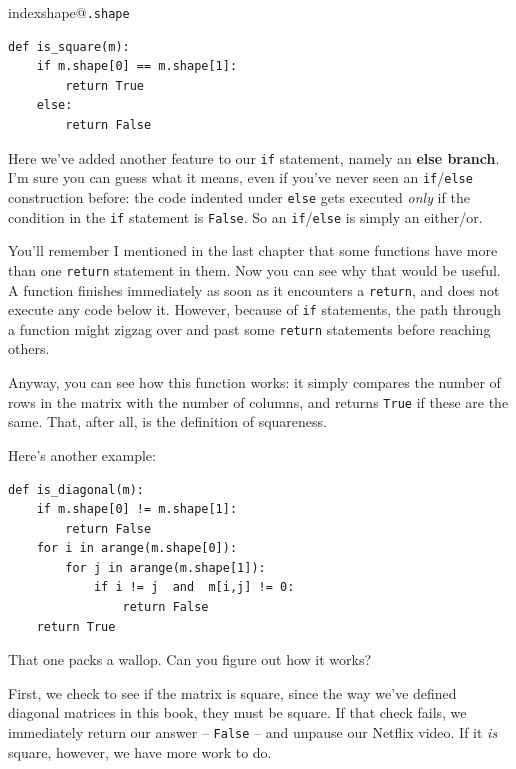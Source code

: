 index{shape@\texttt{.shape}}

\label{multipleReturns}

\begin{Verbatim}[fontsize=\small,samepage=true,frame=single,framesep=3mm]
def is_square(m):
    if m.shape[0] == m.shape[1]:
        return True
    else:
        return False
\end{Verbatim}


Here we've added another feature to our \texttt{if} statement, namely an
\textbf{else branch}. I'm sure you can guess what it means, even if you've
never seen an \texttt{if}/\texttt{else} construction before: the code indented
under \texttt{else} gets executed \textit{only} if the condition in the
\texttt{if} statement is \texttt{False}. So an \texttt{if}/\texttt{else} is
simply an either/or.

You'll remember I mentioned in the last chapter that some functions have more
than one \texttt{return} statement in them. Now you can see why that would be
useful. A function finishes immediately as soon as it encounters a
\texttt{return}, and does not execute any code below it. However, because of
\texttt{if} statements, the path through a function might zigzag over and past
some \texttt{return} statements before reaching others.

Anyway, you can see how this function works: it simply compares the number of
rows in the matrix with the number of columns, and returns \texttt{True} if
these are the same. That, after all, is the definition of squareness.

\bigskip

Here's another example:

\begin{Verbatim}[fontsize=\small,samepage=true,frame=single,framesep=3mm]
def is_diagonal(m):
    if m.shape[0] != m.shape[1]:
        return False
    for i in arange(m.shape[0]):
        for j in arange(m.shape[1]):
            if i != j  and  m[i,j] != 0:
                return False
    return True
\end{Verbatim}

That one packs a wallop. Can you figure out how it works?

First, we check to see if the matrix is square, since the way we've defined
diagonal matrices in this book, they must be square. If that check fails, we
immediately return our answer -- \texttt{False} -- and unpause our Netflix
video. If it \textit{is} square, however, we have more work to do.

